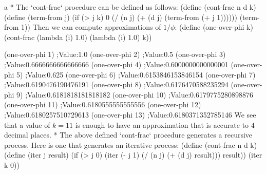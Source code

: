 \begitems\style a
* The `cont-frac` procedure can be defined as follows:
\begtt\scm
(define (cont-frac n d k)
  (define (term-from j)
    (if (> j k)
        0
        (/ (n j)
           (+ (d j) (term-from (+ j 1))))))
  (term-from 1))
\endtt
Then we can compute approximations of $1/\phi$:
\begtt\scm
(define (one-over-phi k)
  (cont-frac (lambda (i) 1.0)
             (lambda (i) 1.0)
             k))

(one-over-phi 1)
;Value:1.0
(one-over-phi 2)
;Value:0.5
(one-over-phi 3)
;Value:0.6666666666666666
(one-over-phi 4)
;Value:0.6000000000000001
(one-over-phi 5)
;Value:0.625
(one-over-phi 6)
;Value:0.6153846153846154
(one-over-phi 7)
;Value:0.6190476190476191
(one-over-phi 8)
;Value:0.6176470588235294
(one-over-phi 9)
;Value:0.6181818181818182
(one-over-phi 10)
;Value:0.6179775280898876
(one-over-phi 11)
;Value:0.6180555555555556
(one-over-phi 12)
;Value:0.6180257510729613
(one-over-phi 13)
;Value:0.6180371352785146
\endtt
We see that a value of $k=11$ is enough to have an approximation that is accurate to $4$ decimal places.
* The above defined `cont-frac` procedure generates a recursive process.  Here is one that generates an iterative process:
\begtt\scm
(define (cont-frac n d k)
  (define (iter j result)
    (if (> j 0)
        (iter (- j 1)
              (/ (n j)
                 (+ (d j) result)))
        result))
  (iter k 0))
\endtt
\enditems
